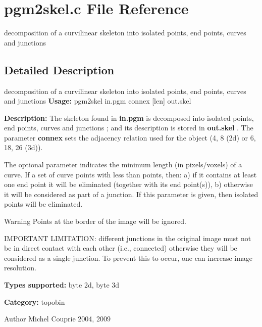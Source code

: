 \section{pgm2skel.c File Reference}
\label{pgm2skel_8c}


decomposition of a curvilinear skeleton into isolated points, end points, curves and junctions  




\subsection{Detailed Description}
decomposition of a curvilinear skeleton into isolated points, end points, curves and junctions {\bfseries Usage:} pgm2skel in.pgm connex [len] out.skel

{\bfseries Description:} The skeleton found in {\bfseries in.pgm} is decomposed into isolated points, end points, curves and junctions ; and its description is stored in {\bfseries out.skel} . The parameter {\bfseries connex} sets the adjacency relation used for the object (4, 8 (2d) or 6, 18, 26 (3d)).

The optional parameter  indicates the minimum length (in pixels/voxels) of a curve. If a set of curve points with less than  points, then: a) if it contains at least one end point it will be eliminated (together with its end point(s)), b) otherwise it will be considered as part of a junction. If this parameter is given, then isolated points will be eliminated.

\begin{DoxyWarning}{Warning}
Points at the border of the image will be ignored.

IMPORTANT LIMITATION: different junctions in the original image must not be in direct contact with each other (i.e., connected) otherwise they will be considered as a single junction. To prevent this to occur, one can increase image resolution.
\end{DoxyWarning}
{\bfseries Types supported:} byte 2d, byte 3d

{\bfseries Category:} topobin

\begin{DoxyAuthor}{Author}
Michel Couprie 2004, 2009 
\end{DoxyAuthor}

